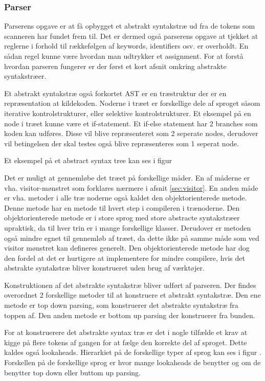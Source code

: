 \subsubsection{Parser}\wip
Parserens opgave er at få opbygget et abstrakt syntakstræ ud fra de tokens som scanneren har fundet frem til. Det er dermed også parserens opgave at tjekket at reglerne i forhold til rækkefølgen af keywords, identifiers osv. er overholdt. En sådan regel kunne være hvordan man udtrykker et assignment. For at forstå hvordan parseren fungerer er der først et kort afsnit omkring abstrakte syntakstræer.

Et abstrakt syntakstræ også forkortet AST er en træstruktur der er en repræsentation at kildekoden. Noderne i træet er forskellige dele af sproget såsom iterative kontrolstrukturer, eller selektive kontrolstrukturer. Et eksempel på en node i træet kunne være et if-statement. Et if-else statement har 2 branches som koden kan udføres. Disse vil blive repræsenteret som 2 seperate nodes, derudover vil betingelsen der skal testes også blive repræsenteres som 1 seperat node.

Et eksempel på et abstract syntax tree kan ses i figur

Det er muligt at gennemløbe det træet på forskellige måder. En af måderne er vha. visitor-mønstret som forklares nærmere i afsnit \ref{sec:visitor}. En anden måde er vha. metoder i alle træ noderne også kaldet den objektorienterede metode. Denne metode har en metode til hvert step i compileren i trænoderne. Den objektorienterede metode er i store sprog med  store abstracte syntakstræer upraktisk, da til hver trin er i mange forskellige klasser. Derudover er metoden også mindre egnet til gennemløb af træet, da dette ikke på samme måde som ved visitor mønstret kan defineres generelt. Den objektorienterede metode har dog den fordel at det er hurtigere at implementere for mindre compilere, hvis det abstrakte syntakstræ bliver konstrueret uden brug af værktøjer.

Konstruktionen af det abstrakte syntakstræ bliver udført af parseren. Der findes overordnet 2 forskellige metoder til at konstruere et abstrakt syntakstræ. Den ene metode er top down parsing, som konstruerer det abstrakte syntakstræ fra toppen af. Den anden metode er bottom up parsing der konstruerer fra bunden.

For at konstruerere det abstrakte syntax træ er det i nogle tilfælde et krav at kigge på flere tokens af gangen for at fælge den korrekte del af sproget. Dette kaldes også lookaheads. Hierarkiet på de forskellige typer af sprog kan ses i figur . Forskellen på de forskellige sprog er hvor mange lookaheads de benytter og om de benytter top down eller buttom up parsing.


